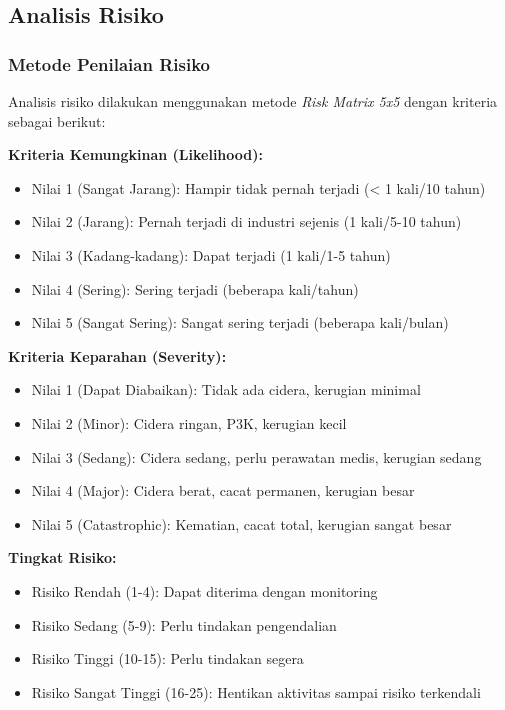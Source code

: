 \vspace{1cm}

\subsection{Analisis Risiko}
\label{subsec:analisis-risiko}


\subsubsection{Metode Penilaian Risiko}

Analisis risiko dilakukan menggunakan metode \textit{Risk Matrix 5x5} dengan kriteria sebagai berikut:

\textbf{Kriteria Kemungkinan (Likelihood):}
\begin{itemize}
    \item Nilai 1 (Sangat Jarang): Hampir tidak pernah terjadi (< 1 kali/10 tahun)
    \item Nilai 2 (Jarang): Pernah terjadi di industri sejenis (1 kali/5-10 tahun)
    \item Nilai 3 (Kadang-kadang): Dapat terjadi (1 kali/1-5 tahun)
    \item Nilai 4 (Sering): Sering terjadi (beberapa kali/tahun)
    \item Nilai 5 (Sangat Sering): Sangat sering terjadi (beberapa kali/bulan)
\end{itemize}

\textbf{Kriteria Keparahan (Severity):}
\begin{itemize}
    \item Nilai 1 (Dapat Diabaikan): Tidak ada cidera, kerugian minimal
    \item Nilai 2 (Minor): Cidera ringan, P3K, kerugian kecil
    \item Nilai 3 (Sedang): Cidera sedang, perlu perawatan medis, kerugian sedang
    \item Nilai 4 (Major): Cidera berat, cacat permanen, kerugian besar
    \item Nilai 5 (Catastrophic): Kematian, cacat total, kerugian sangat besar
\end{itemize}

\textbf{Tingkat Risiko:}
\begin{itemize}
    \item Risiko Rendah (1-4): Dapat diterima dengan monitoring
    \item Risiko Sedang (5-9): Perlu tindakan pengendalian
    \item Risiko Tinggi (10-15): Perlu tindakan segera
    \item Risiko Sangat Tinggi (16-25): Hentikan aktivitas sampai risiko terkendali
\end{itemize}

